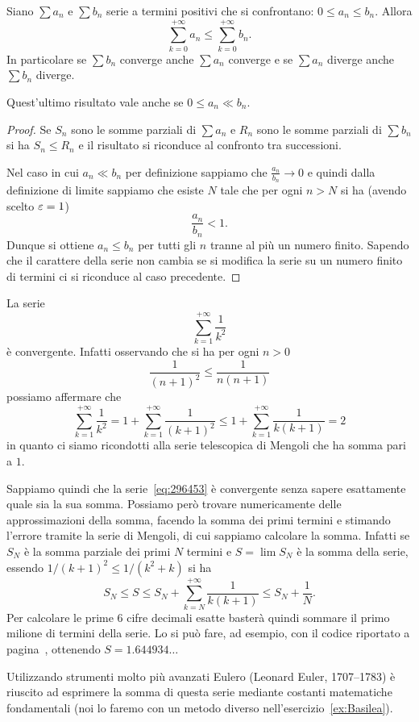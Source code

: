 \begin{theorem}
\mymark{**}
Siano $\sum a_n$ e $\sum b_n$ serie a
termini positivi che si confrontano: $0\le a_n\le b_n$.
Allora
\[
  \sum_{k=0}^{+\infty} a_n \le \sum_{k=0}^{+\infty} b_n.
\]
In particolare se $\sum b_n$ converge anche $\sum a_n$ converge
e se $\sum a_n$ diverge anche $\sum b_n$ diverge.

Quest'ultimo risultato vale anche se $0 \le a_n \ll b_n$.
\end{theorem}
%
\begin{proof}
\mymark{*}
Se $S_n$ sono le somme parziali di $\sum a_n$ e $R_n$ sono le somme
parziali di $\sum b_n$ si ha $S_n \le R_n$ e il risultato
si riconduce al confronto tra successioni.

Nel caso in cui $a_n \ll b_n$ per definizione sappiamo che $\frac{a_n}{b_n}\to 0$
e quindi dalla definizione di limite sappiamo che
esiste $N$ tale che per ogni $n>N$ si ha (avendo scelto $\varepsilon=1$)
\[
  \frac{a_n}{b_n} < 1.
\]
Dunque si ottiene $a_n \le b_n$ per tutti gli $n$ tranne al più un numero
finito. Sapendo che il carattere della serie non cambia se si modifica
la serie su un numero finito di termini ci si riconduce al caso precedente.
\end{proof}

\begin{example}\label{ex:52573}
\mymark{***}
La serie
\begin{equation}\label{eq:296453}
 \sum_{k=1}^{+\infty} \frac{1}{k^2}
\end{equation}
è convergente.
Infatti osservando che si ha per ogni $n>0$
\[
  \frac{1}{(n+1)^2} \le \frac{1}{n(n+1)}
\]
possiamo affermare che
\[
  \sum_{k=1}^{+\infty} \frac{1}{k^2}
  = 1 + \sum_{k=1}^{+\infty} \frac{1}{(k+1)^2}
  \le 1+ \sum_{k=1}^{+\infty} \frac{1}{k(k+1)}
  = 2
\]
in quanto ci siamo ricondotti alla
serie telescopica di Mengoli che ha somma pari a $1$.

Sappiamo quindi che la serie~\eqref{eq:296453} è convergente
senza sapere esattamente quale sia la sua somma.
Possiamo però trovare numericamente delle approssimazioni
della somma, facendo la somma dei primi termini
e stimando l'errore tramite la serie di Mengoli,
di cui sappiamo calcolare la somma.
Infatti se $S_N$ è la somma parziale dei primi
$N$ termini e $S = \lim S_N$ è la somma della serie,
essendo $1/(k+1)^2 \le 1/(k^2+k)$ si ha
\[
S_N
\le S
\le S_N + \sum_{k=N}^{+\infty} \frac{1}{k(k+1)}
\le S_N + \frac{1}{N}.
\]
Per calcolare le prime 6 cifre decimali esatte basterà
quindi sommare il primo milione di termini della serie.
Lo si può fare, ad esempio, con il codice riportato
a pagina~\pageref{code:series}, ottenendo $S=1.644934\ldots$

Utilizzando strumenti molto più avanzati
Eulero 
(Leonard Euler, 1707--1783) è
riuscito ad esprimere la somma di questa serie mediante costanti matematiche fondamentali
(noi lo faremo con un metodo diverso nell'esercizio~\ref{ex:Basilea}).
\end{example}

